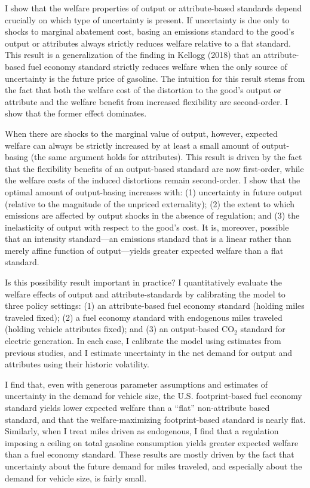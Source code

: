 \documentclass[12pt]{article}
\begin{document}
I show that the welfare properties of output or attribute-based standards depend crucially on which type of uncertainty is present. If uncertainty is due only to shocks to marginal abatement cost, basing an emissions standard to the good's output or attributes always strictly reduces welfare relative to a flat standard. This result is a generalization of the finding in Kellogg (2018) that an attribute-based fuel economy standard strictly reduces welfare when the only source of uncertainty is the future price of gasoline. The intuition for this result stems from the fact that both the welfare cost of the distortion to the good's output or attribute and the welfare benefit from increased flexibility are second-order. I show that the former effect dominates.

When there are shocks to the marginal value of output, however, expected welfare can always be strictly increased by at least a small amount of output-basing (the same argument holds for attributes). This result is driven by the fact that the flexibility benefits of an output-based standard are now first-order, while the welfare costs of the induced distortions remain second-order. I show that the optimal amount of output-basing increases with: (1) uncertainty in future output (relative to the magnitude of the unpriced externality); (2) the extent to which emissions are affected by output shocks in the absence of regulation; and (3) the inelasticity of output with respect to the good's cost. It is, moreover, possible that an intensity standard---an emissions standard that is a linear rather than merely affine function of output---yields greater expected welfare than a flat standard.

Is this possibility result important in practice? I quantitatively evaluate the welfare effects of output and attribute-standards by calibrating the model to three policy settings: (1) an attribute-based fuel economy standard (holding miles traveled fixed); (2) a fuel economy standard with endogenous miles traveled (holding vehicle attributes fixed); and (3) an output-based CO$_{\text{2}}$ standard for electric generation. In each case, I calibrate the model using estimates from previous studies, and I estimate uncertainty in the net demand for output and attributes using their historic volatility.

I find that, even with generous parameter assumptions and estimates of uncertainty in the demand for vehicle size, the U.S. footprint-based fuel economy standard yields lower expected welfare than a ``flat'' non-attribute based standard, and that the welfare-maximizing footprint-based standard is nearly flat. Similarly, when I treat miles driven as endogenous, I find that a regulation imposing a ceiling on total gasoline consumption yields greater expected welfare than a fuel economy standard. These results are mostly driven by the fact that uncertainty about the future demand for miles traveled, and especially about the demand for vehicle size, is fairly small. 
\end{document}
